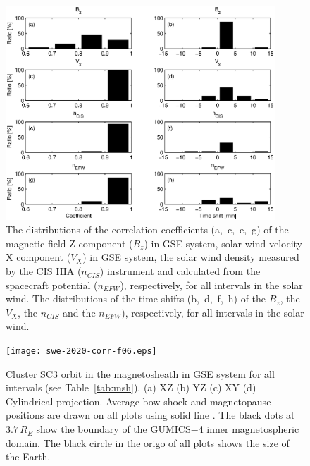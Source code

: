 \documentclass[linenumbers,draft]{agujournal}
\begin{document}
\begin{figure}[h]
\centering
\includegraphics[width=0.9\textwidth,angle=0]{swe-2020-corr-f05.eps}  
\caption{The distributions of the correlation coefficients (a,~c,~e,~g) of the magnetic field Z component ($B_z$) in GSE system, solar wind velocity X component ($V_X$) in GSE system, the solar wind density measured by the CIS HIA ($n_{CIS}$) instrument and calculated from the spacecraft potential ($n_{EFW}$), respectively, for all intervals in the solar wind. The distributions of the time shifts (b,~d,~f,~h) of the $B_z$, the $V_X$, the $n_{CIS}$ and the $n_{EFW}$), respectively, for all intervals in the solar wind.}
\label{fig:swcorrplot}
\end{figure}

\pagebreak

\begin{figure}[h]
\centering
\texttt{[image: swe-2020-corr-f06.eps]}  
\caption{Cluster SC3 orbit in the magnetosheath in GSE system for all intervals (see Table~\ref{tab:msh}). (a) XZ (b) YZ (c) XY (d) Cylindrical projection. Average bow-shock and magnetopause positions are drawn on all plots using solid line \citep[][respectively]{peredo95:_three_alfven_mach,tsyganenko95:_model_earth}. The black dots at $3.7\,R_E$ show the boundary of the GUMICS$-$4 inner magnetospheric domain. The black circle in the origo of all plots shows the size of the Earth.}
\label{fig:mshorbit}
\end{figure}

\pagebreak
\end{document}
